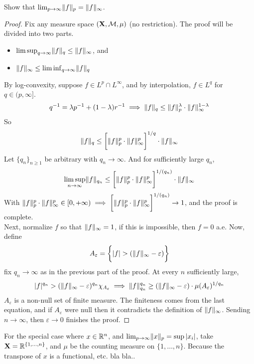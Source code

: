 \documentclass[../../main.tex]{subfiles}
\begin{document}
\providecommand{\xx}{\mathbf{X}}
\begin{wts}
    Show that $\lim_{p\to\infty}\lVert {f} \rVert_p = \lVert {f} \rVert_\infty$.
\end{wts}
\begin{proof}
    Fix any measure space $(\xx, \mcal, \mu)$ (no restriction). The proof will be divided into two parts.
    \begin{itemize}
        \item $\limsup_{q\to\infty} \lVert {f} \rVert_q\leq \lVert {f} \rVert_\infty$, and 
        \item $\lVert {f} \rVert_\infty\leq\liminf_{q\to\infty}\lVert {f} \rVert_q$
    \end{itemize}
    By log-convexity, suppose $f\in L^p\cap L^\infty$, and by interpolation, $f\in L^q$ for $q\in (p,\infty]$. 
    \begin{equation}\label{log-convex expression}
        q^{-1} = \lambda p^{-1} + (1-\lambda)r^{-1}\implies \lVert {f} \rVert_q\leq\lVert {f} \rVert_p^\lambda\cdot\lVert {f} \rVert_\infty^{1-\lambda}
    \end{equation}
    So
    \begin{align*}
        \lVert {f} \rVert_q\leq\biggl[\lVert {f} \rVert_p^p\cdot\lVert {f} \rVert_\infty^p \biggr]^{1/q}\cdot\lVert {f} \rVert_\infty
    \end{align*}
    Let $\{q_n\}_{n\geq 1}$ be arbitrary with $q_n\to\infty$. And for sufficiently large $q_n$,
    \[
        \limsup_{n\to\infty}\lVert {f} \rVert_{q_n}\leq\biggl[\lVert {f} \rVert_p^p\cdot\lVert {f} \rVert_\infty^p\biggr]^{1/(q_n)}\cdot\lVert {f} \rVert_\infty
    \]
    With $\lVert {f} \rVert_p^p\cdot\lVert {f} \rVert_\infty^p\in[0,+\infty)\implies \biggl[\lVert {f} \rVert_p^p\cdot\lVert {f} \rVert_\infty^p\biggr]^{1/(q_n)}\to 1$, and the proof is complete.\\

    Next, normalize $f$ so that $\lVert {f} \rVert_\infty = 1$, if this is impossible, then $f = 0$ a.e. Now, define
    \[
        A_{\varepsilon} = \biggl\{{|f| > (\lVert {f} \rVert_\infty - \varepsilon)}\biggr\}
    \]
    fix $q_n\to\infty$ as in the previous part of the proof. At every $n$ sufficiently large,
    \[
        |f|^{q_n} > (\lVert {f} \rVert_\infty - \varepsilon)^{q_n} \chi_{A_{\varepsilon}}\implies\lVert {f} \rVert_{q_n}^{q_n}\geq (\lVert {f} \rVert_\infty - \varepsilon)\cdot\mu(A_\varepsilon)^{1/{q_n}}
    \]
    $A_\varepsilon$ is a non-null set of finite measure. The finiteness comes from the last equation, and if $A_\varepsilon$ were null then it contradicts the definition of $\lVert {f} \rVert_\infty$. Sending $n\to\infty$, then $\varepsilon\to 0$ finishes the proof.
\end{proof}
\begin{corollary}
    For the special case where $x\in{\mathbb{R}^n}$, and $\lim_{p\to\infty}\lVert {x} \rVert_p=\sup |x_i|$, take $\xx = \real^{\{1,\ldots, n\}}$, and $\mu$ be the counting measure on $\{1,\ldots, n\}$. Because the transpose of $x$ is a functional, etc. bla bla..
\end{corollary}
\end{document}
